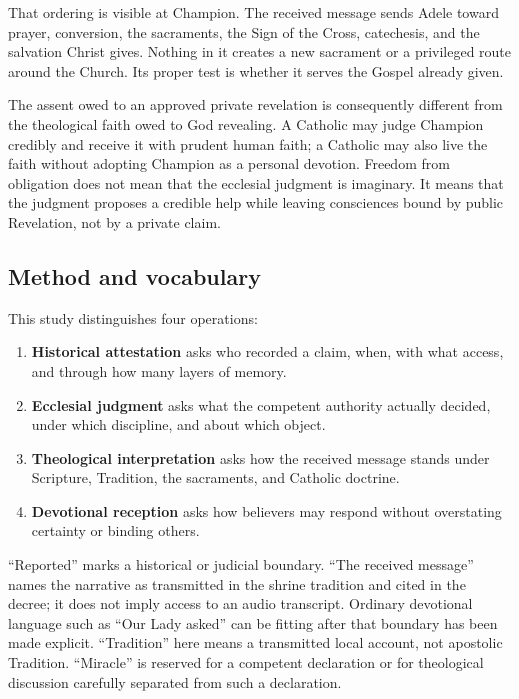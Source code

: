 {That ordering is visible at Champion. The received message sends Adele toward prayer, conversion, the sacraments, the Sign of the Cross, catechesis, and the salvation Christ gives. Nothing in it creates a new sacrament or a privileged route around the Church. Its proper test is whether it serves the Gospel already given.

The assent owed to an approved private revelation is consequently different from the theological faith owed to God revealing. A Catholic may judge Champion credibly and receive it with prudent human faith; a Catholic may also live the faith without adopting Champion as a personal devotion. Freedom from obligation does not mean that the ecclesial judgment is imaginary. It means that the judgment proposes a credible help while leaving consciences bound by public Revelation, not by a private claim.

\subsection{Method and vocabulary}

This study distinguishes four operations:

\begin{enumerate}
  \item \textbf{Historical attestation} asks who recorded a claim, when, with what access, and through how many layers of memory.
  \item \textbf{Ecclesial judgment} asks what the competent authority actually decided, under which discipline, and about which object.
  \item \textbf{Theological interpretation} asks how the received message stands under Scripture, Tradition, the sacraments, and Catholic doctrine.
  \item \textbf{Devotional reception} asks how believers may respond without overstating certainty or binding others.
\end{enumerate}

“Reported” marks a historical or judicial boundary. “The received message” names the narrative as transmitted in the shrine tradition and cited in the decree; it does not imply access to an audio transcript. Ordinary devotional language such as “Our Lady asked” can be fitting after that boundary has been made explicit. “Tradition” here means a transmitted local account, not apostolic Tradition. “Miracle” is reserved for a competent declaration or for theological discussion carefully separated from such a declaration.

}
